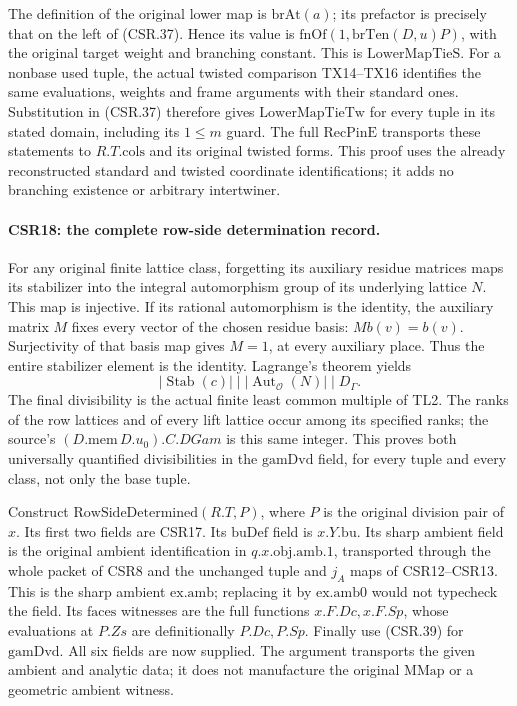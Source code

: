 The definition of the original lower map is
\(\mathrm{brAt}(a)\); its prefactor is precisely that on the
left of (CSR.37). Hence its value is
\(\mathrm{fnOf}(1,\mathrm{brTen}(D,u)P)\), with the original
target weight and branching constant. This is
\(\mathrm{LowerMapTieS}\). For a nonbase used tuple, the
actual twisted comparison TX14--TX16 identifies the same
evaluations, weights and frame arguments with their standard
ones. Substitution in (CSR.37) therefore gives
\(\mathrm{LowerMapTieTw}\) for every tuple in its stated
domain, including its \(1\leq m\) guard. The full
\(\mathrm{RecPinE}\) transports these statements to
\(R.T.\mathrm{cols}\) and its original twisted forms.
This proof uses the already reconstructed standard and
twisted coordinate identifications; it adds no branching
existence or arbitrary intertwiner.

\paragraph{CSR18: the complete row-side determination record.}
\label{claim:CSR18}
For any original finite lattice class, forgetting its
auxiliary residue matrices maps its stabilizer into the
integral automorphism group of its underlying lattice \(N\).
This map is injective. If its rational automorphism is the
identity, the auxiliary matrix \(M\) fixes every vector of
the chosen residue basis: \(M b(v)=b(v)\). Surjectivity of
that basis map gives \(M=1\), at every auxiliary place.
Thus the entire stabilizer element is the identity.
Lagrange's theorem yields
\[
 |\operatorname{Stab}(c)|\mid |\operatorname{Aut}_{\mathcal O}(N)|
       \mid D_{\Gamma}.
 \tag{CSR.39}
\]
The final divisibility is the actual finite least common
multiple of TL2. The ranks of the row lattices and of every
lift lattice occur among its specified ranks; the source's
\((D.\mathrm{mem}\,D.u_0).C.DGam\) is this same integer.
This proves both universally quantified divisibilities in
the \(\mathrm{gamDvd}\) field, for every tuple and
every class, not only the base tuple.

Construct \(\mathrm{RowSideDetermined}(R.T,P)\), where
\(P\) is the original division pair of \(x\).
Its first two fields are CSR17. Its \(\mathrm{buDef}\) field
is \(x.Y.\mathrm{bu}\). Its sharp ambient field is the original
ambient identification in \(q.x.\mathrm{obj.amb}.1\),
transported through the whole packet of CSR8 and the unchanged
tuple and \(j_A\) maps of CSR12--CSR13. This is the sharp
ambient \(\mathrm{ex.amb}\); replacing it by
\(\mathrm{ex.amb0}\) would not typecheck the field.
Its \(\mathrm{faces}\) witnesses are the full functions
\(x.F.Dc,x.F.Sp\), whose evaluations at \(P.Zs\) are
definitionally \(P.Dc,P.Sp\). Finally use (CSR.39) for
\(\mathrm{gamDvd}\). All six fields are now supplied.
The argument transports the given ambient and analytic
data; it does not manufacture the original \(\mathrm{MMap}\)
or a geometric ambient witness.

